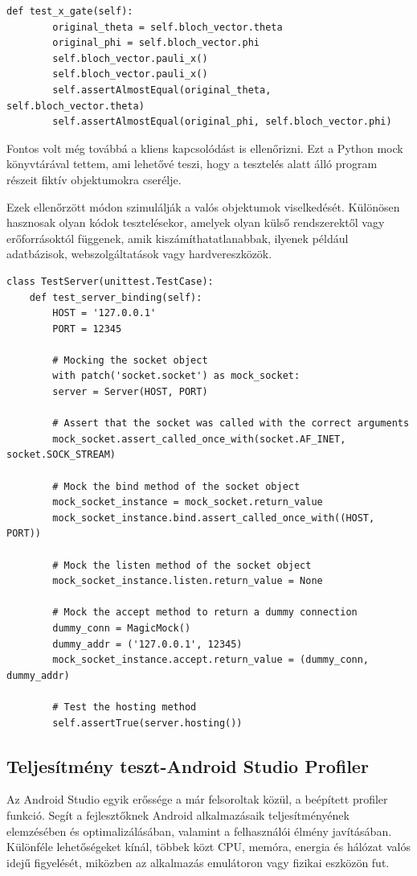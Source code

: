 \documentclass[
]{thesis-ekf}
\theoremstyle{definition}
\theoremstyle{remark}
\begin{document}
\begin{lstlisting}[caption={Pauli-X kapu unit teszt}]
    def test_x_gate(self):
		original_theta = self.bloch_vector.theta
		original_phi = self.bloch_vector.phi
		self.bloch_vector.pauli_x()
		self.bloch_vector.pauli_x()
		self.assertAlmostEqual(original_theta, self.bloch_vector.theta)
		self.assertAlmostEqual(original_phi, self.bloch_vector.phi)
\end{lstlisting}

Fontos volt még továbbá a kliens kapcsolódást is ellenőrizni. Ezt a Python mock könyvtárával tettem, ami lehetővé teszi, hogy a tesztelés alatt álló program részeit fiktív objektumokra cserélje.

Ezek ellenőrzött módon szimulálják a valós objektumok viselkedését. Különösen hasznosak olyan kódok tesztelésekor, amelyek olyan külső rendszerektől vagy erőforrásoktól függenek, amik kiszámíthatatlanabbak, ilyenek például adatbázisok, webszolgáltatások vagy hardvereszközök.

\begin{lstlisting}[caption={Kliens csatlakozás unit teszt}]
class TestServer(unittest.TestCase):
	def test_server_binding(self):
		HOST = '127.0.0.1'
		PORT = 12345
		
		# Mocking the socket object
		with patch('socket.socket') as mock_socket:
		server = Server(HOST, PORT)
		
		# Assert that the socket was called with the correct arguments
		mock_socket.assert_called_once_with(socket.AF_INET, socket.SOCK_STREAM)
		
		# Mock the bind method of the socket object
		mock_socket_instance = mock_socket.return_value
		mock_socket_instance.bind.assert_called_once_with((HOST, PORT))
		
		# Mock the listen method of the socket object
		mock_socket_instance.listen.return_value = None
		
		# Mock the accept method to return a dummy connection
		dummy_conn = MagicMock()
		dummy_addr = ('127.0.0.1', 12345)
		mock_socket_instance.accept.return_value = (dummy_conn, dummy_addr)
		
		# Test the hosting method
		self.assertTrue(server.hosting())

\end{lstlisting}

\subsection{Teljesítmény teszt-Android Studio Profiler}
Az Android Studio egyik erőssége a már felsoroltak közül, a beépített profiler funkció. Segít a fejlesztőknek Android alkalmazásaik teljesítményének elemzésében és optimalizálásában, valamint a felhasználói élmény javításában. Különféle lehetőségeket kínál, többek közt CPU, memóra, energia és hálózat valós idejű figyelését, miközben az alkalmazás emulátoron vagy fizikai eszközön fut.
\end{document}
